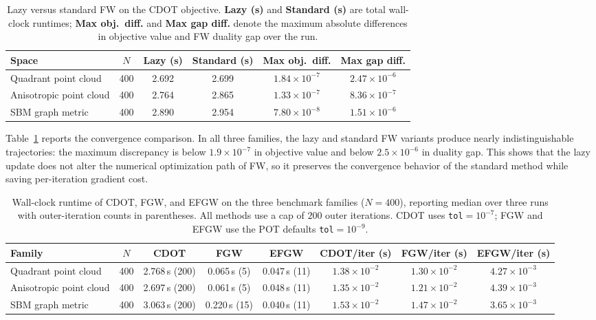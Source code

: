 \documentclass{article}
\theoremstyle{plain}
\theoremstyle{definition}
\theoremstyle{remark}
\begin{document}
\begin{table}[H]
	\centering
	\setlength{\tabcolsep}{5.2pt}
	\caption{Lazy versus standard FW on the CDOT objective. \textbf{Lazy (s)} and \textbf{Standard (s)} are total wall-clock runtimes; \textbf{Max obj.\ diff.} and \textbf{Max gap diff.} denote the maximum absolute differences in objective value and FW duality gap over the run.}
	\label{tab:lazy-vs-standard-fw}
	\renewcommand{\arraystretch}{1.1}
	\footnotesize
	\begin{tabular}{lccccc}
		\toprule
		\textbf{Space} & $N$ & \textbf{Lazy (s)} & \textbf{Standard (s)} & \textbf{Max obj.\ diff.} & \textbf{Max gap diff.} \\
		\midrule
		Quadrant point cloud    & 400 & 2.692 & 2.699 & $1.84 \times 10^{-7}$ & $2.47 \times 10^{-6}$ \\
		Anisotropic point cloud & 400 & 2.764 & 2.865 & $1.33 \times 10^{-7}$ & $8.36 \times 10^{-7}$ \\
		SBM graph metric        & 400 & 2.890 & 2.954 & $7.80 \times 10^{-8}$ & $1.51 \times 10^{-6}$ \\
		\bottomrule
	\end{tabular}
\end{table}

Table~\ref{tab:lazy-vs-standard-fw} reports the convergence comparison. In all three families, the lazy and standard FW variants produce nearly indistinguishable trajectories: the maximum discrepancy is below $1.9 \times 10^{-7}$ in objective value and below $2.5 \times 10^{-6}$ in duality gap. This shows that the lazy update does not alter the numerical optimization path of FW, so it preserves the convergence behavior of the standard method while saving per-iteration gradient cost.

\begin{table}[H]
	\centering
	\setlength{\tabcolsep}{5.0pt}
	\caption{Wall-clock runtime of CDOT, FGW, and EFGW on the three benchmark families ($N=400$), reporting median over three runs with outer-iteration counts in parentheses. All methods use a cap of $200$ outer iterations. CDOT uses \texttt{tol}$=10^{-7}$; FGW and EFGW use the POT defaults \texttt{tol}$=10^{-9}$.}
	\label{tab:wallclock-runtime}
	\renewcommand{\arraystretch}{1.1}
	\footnotesize
	\begin{tabular}{lccccccc}
		\toprule
		\textbf{Family} & $N$ & \textbf{CDOT} & \textbf{FGW} & \textbf{EFGW} & \textbf{CDOT/iter (s)} & \textbf{FGW/iter (s)} & \textbf{EFGW/iter (s)} \\
		\midrule
		Quadrant point cloud    & 400 & 2.768\,s (200) & 0.065\,s (5)  & 0.047\,s (11) & $1.38 \times 10^{-2}$ & $1.30 \times 10^{-2}$ & $4.27 \times 10^{-3}$ \\
		Anisotropic point cloud & 400 & 2.697\,s (200) & 0.061\,s (5)  & 0.048\,s (11) & $1.35 \times 10^{-2}$ & $1.21 \times 10^{-2}$ & $4.39 \times 10^{-3}$ \\
		SBM graph metric        & 400 & 3.063\,s (200) & 0.220\,s (15) & 0.040\,s (11) & $1.53 \times 10^{-2}$ & $1.47 \times 10^{-2}$ & $3.65 \times 10^{-3}$ \\
		\bottomrule
	\end{tabular}
\end{table}
\end{document}

